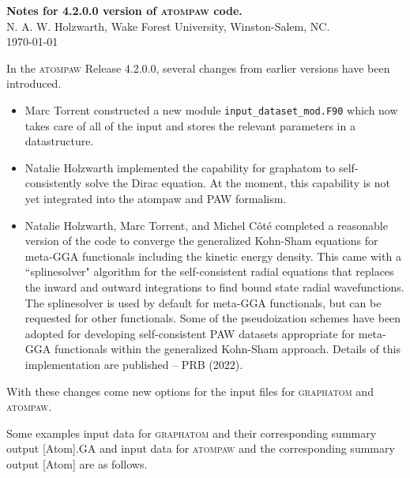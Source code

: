 \documentclass[11pt]{article}
\begin{document}
\begin{center}
{{{\bf{Notes for 4.2.0.0 version of {\textsc{atompaw}} code.}}}} \\
{N. A. W. Holzwarth, Wake Forest University, Winston-Salem, NC. \\
 \today}
\end{center}

In the \textsc{atompaw} Release 4.2.0.0, several changes from
earlier versions have been introduced.    

\begin{itemize}
\item Marc Torrent constructed a new module {\verb+input_dataset_mod.F90+}
which now takes care of all of the input and stores the relevant
parameters in a datastructure.
\item Natalie Holzwarth implemented the capability for graphatom
to self-consistently solve the Dirac equation.   At the moment, this
capability is not yet integrated into the atompaw and PAW
formalism.
\item Natalie Holzwarth, Marc Torrent, and Michel C\^{o}t\'{e} 
completed a reasonable version of the code to converge the
generalized Kohn-Sham equations for meta-GGA functionals including
the kinetic energy density.     This came with a ``splinesolver"
algorithm for the self-consistent radial equations that replaces
the inward and outward integrations to find bound state 
radial wavefunctions.    The splinesolver is used by default
for meta-GGA functionals, but can be requested for other 
functionals.   Some of the pseudoization schemes have been
adopted for developing self-consistent PAW datasets appropriate
for meta-GGA functionals within the generalized Kohn-Sham approach.
Details of this implementation are published -- PRB (2022).
\end{itemize}



With these changes come new options for the input files for
\textsc{graphatom} and \textsc{atompaw}.


Some examples input data for \textsc{graphatom} and their
corresponding summary output [Atom].GA and input data for
\textsc{atompaw} and the corresponding summary output [Atom] are as follows.
\end{document}
